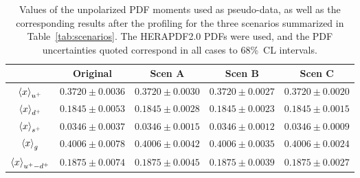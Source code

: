\begin{table}[h]
  \centering
  \renewcommand{\arraystretch}{1.3} 
\begin{tabular}{c||c|c|c|c}
  \hline &  Original  & Scen A  &  Scen B  &  Scen C  \\
  \hline
  \hline
  $\left\langle x\right\rangle_{u^+}$     &  $0.3720\pm 0.0036$  &  $0.3720\pm 0.0030$  &  $0.3720\pm 0.0027$  &  $0.3720\pm 0.0020$ \\
  $\left\langle x\right\rangle_{d^+}$     &  $0.1845\pm 0.0053$  &  $0.1845\pm 0.0028$  &  $0.1845\pm 0.0023$  &  $0.1845\pm 0.0015$ \\
  $\left\langle x\right\rangle_{s^+}$     &  $0.0346\pm 0.0037$  &  $0.0346\pm 0.0015$  &  $0.0346\pm 0.0012$  &  $0.0346\pm 0.0009$ \\
  $\left\langle x\right\rangle_{g}$       &  $0.4006\pm 0.0078$  &  $0.4006\pm 0.0042$  &  $0.4006\pm 0.0035$  &  $0.4006\pm 0.0024$ \\
  $\left\langle x\right\rangle_{u^+-d^+}$ &  $0.1875\pm 0.0074$  &  $0.1875\pm 0.0045$  &  $0.1875\pm 0.0039$  &  $0.1875\pm 0.0027$ \\
  \hline
\end{tabular}
\caption{\small Values of the unpolarized PDF moments
  used as pseudo-data, as well as the corresponding results
  after the profiling  for the
three scenarios summarized in Table~\ref{tab:scenarios}.
%
The HERAPDF2.0 PDFs were used, and the PDF uncertainties quoted correspond in all cases to 68\%~CL intervals.
\label{tab:unpolmomentsProf}
}
\end{table}




